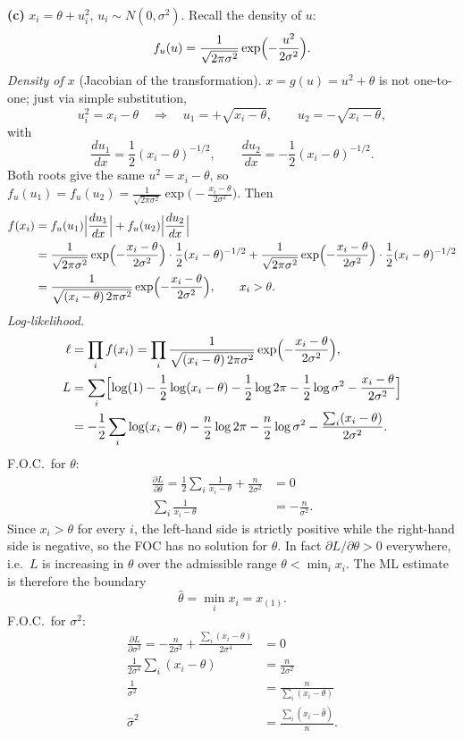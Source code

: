 \documentclass[11pt]{article}
\begin{document}
\textbf{(c)} $x_i=\theta+u_i^2$, $u_i\sim N(0,\sigma^2)$. Recall the density of $u$:
\[
  f_u(u)=\frac{1}{\sqrt{2\pi\sigma^2}}\exp\Bigl(-\frac{u^2}{2\sigma^2}\Bigr).
\]
\emph{Density of $x$} (Jacobian of the transformation). $x=g(u)=u^2+\theta$ is not one-to-one; just via simple substitution,
\[
  u_i^2=x_i-\theta\quad\Rightarrow\quad u_{1}=+\sqrt{x_i-\theta},\qquad u_{2}=-\sqrt{x_i-\theta},
\]
with
\[
  \frac{du_1}{dx}=\frac12(x_i-\theta)^{-1/2},\qquad \frac{du_2}{dx}=-\frac12(x_i-\theta)^{-1/2}.
\]
Both roots give the same $u^2=x_i-\theta$, so $f_u(u_1)=f_u(u_2)=\frac{1}{\sqrt{2\pi\sigma^2}}\exp\bigl(-\frac{x_i-\theta}{2\sigma^2}\bigr)$. Then
\begin{align*}
  f(x_i)&=f_u(u_1)\Bigl|\frac{du_1}{dx}\Bigr|+f_u(u_2)\Bigl|\frac{du_2}{dx}\Bigr|\\
  &=\frac{1}{\sqrt{2\pi\sigma^2}}\exp\Bigl(-\frac{x_i-\theta}{2\sigma^2}\Bigr)\cdot\frac12(x_i-\theta)^{-1/2}
   +\frac{1}{\sqrt{2\pi\sigma^2}}\exp\Bigl(-\frac{x_i-\theta}{2\sigma^2}\Bigr)\cdot\frac12(x_i-\theta)^{-1/2}\\
  &=\frac{1}{\sqrt{(x_i-\theta)\,2\pi\sigma^2}}\exp\Bigl(-\frac{x_i-\theta}{2\sigma^2}\Bigr),\qquad x_i>\theta .
\end{align*}
\emph{Log-likelihood.}
\begin{align*}
  \ell&=\prod_i f(x_i)=\prod_i\frac{1}{\sqrt{(x_i-\theta)\,2\pi\sigma^2}}\exp\Bigl(-\frac{x_i-\theta}{2\sigma^2}\Bigr),\\
  L&=\sum_i\Bigl[\log(1)-\frac12\log(x_i-\theta)-\frac12\log2\pi-\frac12\log\sigma^2-\frac{x_i-\theta}{2\sigma^2}\Bigr]\\
  &=-\frac12\sum_i\log(x_i-\theta)-\frac n2\log2\pi-\frac n2\log\sigma^2-\frac{\sum_i(x_i-\theta)}{2\sigma^2}.
\end{align*}
F.O.C.\ for $\theta$:
\begin{align*}
  \frac{\partial L}{\partial\theta}=\frac12\sum_i\frac{1}{x_i-\theta}+\frac{n}{2\sigma^2}&=0\\
  \sum_i\frac{1}{x_i-\theta}&=-\frac{n}{\sigma^2}.
\end{align*}
Since $x_i>\theta$ for every $i$, the left-hand side is strictly positive while the right-hand side is negative, so
the FOC has no solution for $\theta$. In fact $\partial L/\partial\theta>0$ everywhere, i.e.\ $L$ is increasing in
$\theta$ over the admissible range $\theta<\min_i x_i$. The ML estimate is therefore the boundary
\[
  \hat\theta=\min_i x_i = x_{(1)} .
\]
F.O.C.\ for $\sigma^2$:
\begin{align*}
  \frac{\partial L}{\partial\sigma^2}=-\frac{n}{2\sigma^2}+\frac{\sum_i(x_i-\theta)}{2\sigma^4}&=0\\
  \frac{1}{2\sigma^4}\sum_i(x_i-\theta)&=\frac{n}{2\sigma^2}\\
  \frac{1}{\sigma^2}&=\frac{n}{\sum_i(x_i-\theta)}\\
  \hat\sigma^2&=\frac{\sum_i(x_i-\hat\theta)}{n}.
\end{align*}
\end{document}
